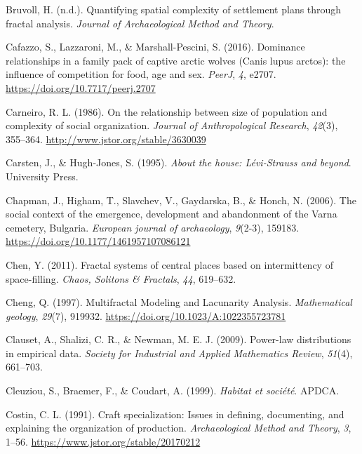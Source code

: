 \documentclass[
  12pt,
]{book}
\newlength{\cslhangindent}
\newlength{\cslentryspacingunit} %
\newenvironment{CSLReferences}[2] %
 {%
  \setlength{\parindent}{0pt}
  \ifodd #1
  \let\oldpar\par
  \def\par{\hangindent=\cslhangindent\oldpar}
  \fi
  \setlength{\parskip}{#2\cslentryspacingunit}
 }%
 {}
\begin{document}
\begin{CSLReferences}{1}{0}
\leavevmode{}%
Bruvoll, H. (n.d.). Quantifying spatial complexity of settlement plans through fractal analysis. \emph{Journal of Archaeological Method and Theory}.

\leavevmode{}%
Cafazzo, S., Lazzaroni, M., \& Marshall-Pescini, S. (2016). Dominance relationships in a family pack of captive arctic wolves (Canis lupus arctos): the influence of competition for food, age and sex. \emph{PeerJ}, \emph{4}, e2707. \url{https://doi.org/10.7717/peerj.2707}

\leavevmode{}%
Carneiro, R. L. (1986). On the relationship between size of population and complexity of social organization. \emph{Journal of Anthropological Research}, \emph{42}(3), 355--364. \url{http://www.jstor.org/stable/3630039}

\leavevmode{}%
Carsten, J., \& Hugh-Jones, S. (1995). \emph{About the house: Lévi-Strauss and beyond}. University Press.

\leavevmode{}%
Chapman, J., Higham, T., Slavchev, V., Gaydarska, B., \& Honch, N. (2006). The social context of the emergence, development and abandonment of the Varna cemetery, Bulgaria. \emph{European journal of archaeology}, \emph{9}(2-3), 159183. \url{https://doi.org/10.1177/1461957107086121}

\leavevmode{}%
Chen, Y. (2011). Fractal systems of central places based on intermittency of space-filling. \emph{Chaos, Solitons \& Fractals}, \emph{44}, 619--632.

\leavevmode{}%
Cheng, Q. (1997). Multifractal Modeling and Lacunarity Analysis. \emph{Mathematical geology}, \emph{29}(7), 919932. \url{https://doi.org/10.1023/A:1022355723781}

\leavevmode{}%
Clauset, A., Shalizi, C. R., \& Newman, M. E. J. (2009). Power-law distributions in empirical data. \emph{Society for Industrial and Applied Mathematics Review}, \emph{51}(4), 661--703.

\leavevmode{}%
Cleuziou, S., Braemer, F., \& Coudart, A. (1999). \emph{Habitat et société}. APDCA.

\leavevmode{}%
Costin, C. L. (1991). Craft specialization: Issues in defining, documenting, and explaining the organization of production. \emph{Archaeological Method and Theory}, \emph{3}, 1--56. \url{https://www.jstor.org/stable/20170212}


\end{CSLReferences}
\end{document}
